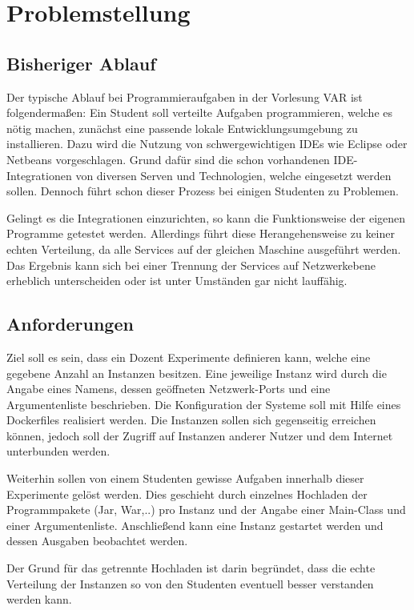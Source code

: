 \chapter{Problemstellung}

\section{Bisheriger Ablauf}
Der typische Ablauf bei Programmieraufgaben in der Vorlesung \ac{VAR} ist folgendermaßen:
Ein Student soll verteilte Aufgaben programmieren, welche es nötig machen, zunächst eine passende lokale Entwicklungsumgebung zu installieren.
Dazu wird die Nutzung von schwergewichtigen \acp{IDE} wie Eclipse oder Netbeans vorgeschlagen.
Grund dafür sind die schon vorhandenen \ac{IDE}-Integrationen von diversen Serven und Technologien, welche eingesetzt werden sollen.
Dennoch führt schon dieser Prozess bei einigen Studenten zu Problemen.
\par
Gelingt es die Integrationen einzurichten, so kann die Funktionsweise der eigenen Programme getestet werden.
Allerdings führt diese Herangehensweise zu keiner echten Verteilung, da alle Services auf der gleichen Maschine ausgeführt werden.
Das Ergebnis kann sich bei einer Trennung der Services auf Netzwerkebene erheblich unterscheiden oder ist unter Umständen gar nicht lauffähig.
\par
[TODO: Beispiel einer Aufgabe z.B. RMI-Chat]
\section{Anforderungen}
Ziel soll es sein, dass ein Dozent Experimente definieren kann, welche eine gegebene Anzahl an Instanzen besitzen.
Eine jeweilige Instanz wird durch die Angabe eines Namens, dessen geöffneten Netzwerk-Ports und eine Argumentenliste beschrieben.
Die Konfiguration der Systeme soll mit Hilfe eines Dockerfiles realisiert werden.
Die Instanzen sollen sich gegenseitig erreichen können, jedoch soll der Zugriff auf Instanzen anderer Nutzer und dem Internet unterbunden werden.
\par
Weiterhin sollen von einem Studenten gewisse Aufgaben innerhalb dieser Experimente gelöst werden.
Dies geschieht durch einzelnes Hochladen der Programmpakete (Jar, War,..) pro Instanz und der Angabe einer Main-Class und einer Argumentenliste.
Anschließend kann eine Instanz gestartet werden und dessen Ausgaben beobachtet werden.
\par
Der Grund für das getrennte Hochladen ist darin begründet, dass die echte Verteilung der Instanzen so von den Studenten eventuell besser verstanden werden kann.

